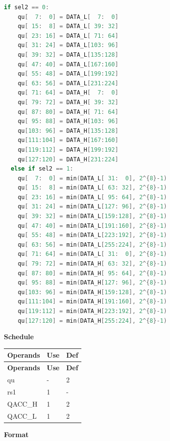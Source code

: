 \begin{lstlisting}[language=C, escapechar=@]
  if sel2 == 0:
    qu[  7:  0] = DATA_L[  7:  0]
    qu[ 15:  8] = DATA_L[ 39: 32]
    qu[ 23: 16] = DATA_L[ 71: 64]
    qu[ 31: 24] = DATA_L[103: 96]
    qu[ 39: 32] = DATA_L[135:128]
    qu[ 47: 40] = DATA_L[167:160]
    qu[ 55: 48] = DATA_L[199:192]
    qu[ 63: 56] = DATA_L[231:224]
    qu[ 71: 64] = DATA_H[  7:  0]
    qu[ 79: 72] = DATA_H[ 39: 32]
    qu[ 87: 80] = DATA_H[ 71: 64]
    qu[ 95: 88] = DATA_H[103: 96]
    qu[103: 96] = DATA_H[135:128]
    qu[111:104] = DATA_H[167:160]
    qu[119:112] = DATA_H[199:192]
    qu[127:120] = DATA_H[231:224]
  else if sel2 == 1:
    qu[  7:  0] = min(DATA_L[ 31:  0], 2^{8}-1)
    qu[ 15:  8] = min(DATA_L[ 63: 32], 2^{8}-1)
    qu[ 23: 16] = min(DATA_L[ 95: 64], 2^{8}-1)
    qu[ 31: 24] = min(DATA_L[127: 96], 2^{8}-1)
    qu[ 39: 32] = min(DATA_L[159:128], 2^{8}-1)
    qu[ 47: 40] = min(DATA_L[191:160], 2^{8}-1)
    qu[ 55: 48] = min(DATA_L[223:192], 2^{8}-1)
    qu[ 63: 56] = min(DATA_L[255:224], 2^{8}-1)
    qu[ 71: 64] = min(DATA_L[ 31:  0], 2^{8}-1)
    qu[ 79: 72] = min(DATA_H[ 63: 32], 2^{8}-1)
    qu[ 87: 80] = min(DATA_H[ 95: 64], 2^{8}-1)
    qu[ 95: 88] = min(DATA_H[127: 96], 2^{8}-1)
    qu[103: 96] = min(DATA_H[159:128], 2^{8}-1)
    qu[111:104] = min(DATA_H[191:160], 2^{8}-1)
    qu[119:112] = min(DATA_H[223:192], 2^{8}-1)
    qu[127:120] = min(DATA_H[255:224], 2^{8}-1)

\end{lstlisting}

\textbf{Schedule}\\
\begin{longtable}[c]{|l|l|l|}
    \hline
    \rowcolor{lightgray}
    \textbf{Operands} & \textbf{Use} & \textbf{Def} \\\hline
    \endfirsthead
    \hline
    \rowcolor{lightgray}
     \textbf{Operands} & \textbf{Use} & \textbf{Def} \\\hline
    \endhead
    \hline
    \endfoot

  qu & - & 2 \\\hline
  rs1 & 1 & - \\\hline
  QACC\_H & 1 & 2 \\\hline
  QACC\_L & 1 & 2

\end{longtable}

\textbf{Format}\\

